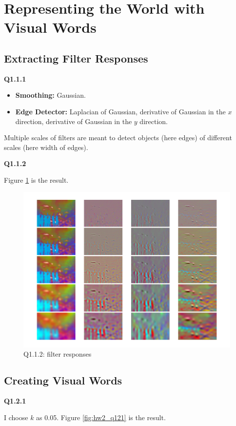 \documentclass[
  course = {{16-720B Computer Vision}},
  quartile = {{1}},
  assignment = 2-Bag\ of \ Visual\ Words,
  name = {{Kangle Deng}},
  email = {{kangled@andrew.cmu.edu}},
  firstexercise = 1
]{aga-homework}
\begin{document}
\section{Representing the World with Visual Words}
\subsection{Extracting Filter Responses}
\noindent \textbf{Q1.1.1}
\begin{itemize}
    \item \textbf{Smoothing:} Gaussian.
    \item \textbf{Edge Detector:} Laplacian of Gaussian, derivative of Gaussian in the $x$ direction, derivative of Gaussian in the $y$ direction.
\end{itemize}

Multiple scales of filters are meant to detect objects (here edges) of different scales (here width of edges).

\noindent \textbf{Q1.1.2} 

Figure \ref{fig:hw2_q112} is the result.
\begin{figure}
    \centering
    \includegraphics{CV/fig/hw2/Q112.pdf}
    \caption{Q1.1.2: filter responses}
    \label{fig:hw2_q112}
\end{figure}

\subsection{Creating Visual Words}
\noindent \textbf{Q1.2.1}

I choose $k$ as 0.05. Figure \ref{fig:hw2_q121} is the result.
\end{document}
